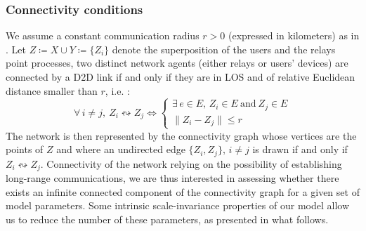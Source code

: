 \documentclass[conference]{IEEEtran}
\begin{document}
\subsubsection{Connectivity conditions}
\indent We assume a constant communication radius $r >0$ (expressed in kilometers) as in \cite{glauche_continuum_2003}. Let $Z \coloneqq X \cup Y \coloneqq \lbrace Z_{i} \rbrace$ denote the superposition of the users and the relays point processes, two distinct network agents (either relays or users' devices) are connected by a D2D link if and only if they are in LOS and of relative Euclidean distance smaller than $r$, i.e. :
\begin{equation}
\label{connectivity_mechanism}
\forall \, i \neq j, \: Z_{i} \leftrightsquigarrow Z_{j} \Leftrightarrow 
\left\{
\begin{array}{l}
\exists \, e \in E, \, Z_{i} \in E  \  \text{and} \  Z_{j} \in E \\
\lVert Z_{i} - Z_{j} \rVert \leq r
\end{array}
\right.
\end{equation}
\indent The network is then represented by the connectivity graph 
whose vertices are the points of $Z$ and where an undirected edge $\lbrace Z_{i},Z_{j}\rbrace, \, i \neq j $ is drawn if and only if $Z_{i} \leftrightsquigarrow Z_{j}$. Connectivity of the network relying on the possibility of establishing long-range communications, we are thus interested in assessing whether there exists an infinite connected component of the connectivity graph for a given set of model parameters.
Some intrinsic scale-invariance  properties of our model allow us to reduce the number of these parameters, as presented in what follows. \\
\end{document}
